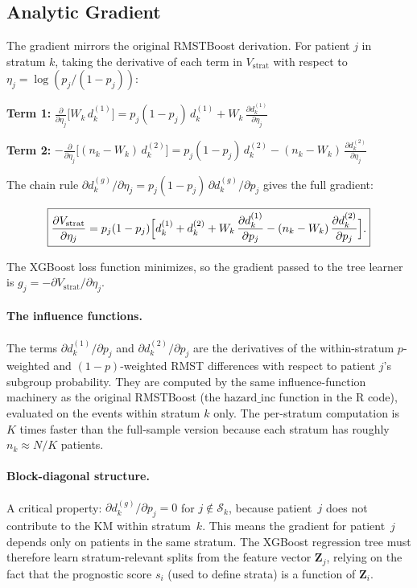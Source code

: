 \documentclass[11pt,letterpaper]{article}
\begin{document}
\subsection{Analytic Gradient}

The gradient mirrors the original RMSTBoost derivation.  For patient $j$
in stratum $k$, taking the derivative of each term in $V_{\text{strat}}$
with respect to $\eta_j = \log(p_j/(1-p_j))$:

\textbf{Term 1:} $\displaystyle\frac{\partial}{\partial\eta_j}\bigl[W_k\,d_k^{(1)}\bigr]
= p_j(1-p_j)\,d_k^{(1)} + W_k\,\frac{\partial d_k^{(1)}}{\partial\eta_j}$

\textbf{Term 2:} $\displaystyle-\frac{\partial}{\partial\eta_j}\bigl[(n_k-W_k)\,d_k^{(2)}\bigr]
= p_j(1-p_j)\,d_k^{(2)} - (n_k-W_k)\,\frac{\partial d_k^{(2)}}{\partial\eta_j}$

The chain rule $\partial d_k^{(g)}/\partial\eta_j =
p_j(1-p_j)\,\partial d_k^{(g)}/\partial p_j$ gives the full gradient:

\[
\boxed{
\frac{\partial V_{\text{strat}}}{\partial\eta_j}
= p_j(1-p_j)\Bigl[
  d_k^{(1)} + d_k^{(2)}
  + W_k\,\frac{\partial d_k^{(1)}}{\partial p_j}
  - (n_k-W_k)\,\frac{\partial d_k^{(2)}}{\partial p_j}
\Bigr].
}
\]

The XGBoost loss function minimizes, so the gradient passed to the tree
learner is $g_j = -\partial V_{\text{strat}}/\partial\eta_j$.

\paragraph{The influence functions.}
The terms $\partial d_k^{(1)}/\partial p_j$ and
$\partial d_k^{(2)}/\partial p_j$ are the derivatives of the
within-stratum $p$-weighted and $(1-p)$-weighted RMST differences with
respect to patient $j$'s subgroup probability.  They are computed by the
same influence-function machinery as the original RMSTBoost (the
$\text{hazard\_inc}$ function in the R code), evaluated on the events
within stratum $k$ only.  The per-stratum computation is $K$ times
faster than the full-sample version because each stratum has roughly
$n_k \approx N/K$ patients.

\paragraph{Block-diagonal structure.}
A critical property: $\partial d_k^{(g)}/\partial p_j = 0$ for $j \notin
\mathcal{S}_k$, because patient~$j$ does not contribute to the KM within
stratum~$k$.  This means the gradient for patient~$j$ depends only on
patients in the same stratum.  The XGBoost regression tree must therefore
learn stratum-relevant splits from the feature vector $\bm{Z}_j$, relying
on the fact that the prognostic score $s_i$ (used to define strata) is a
function of $\bm{Z}_i$.
\end{document}

